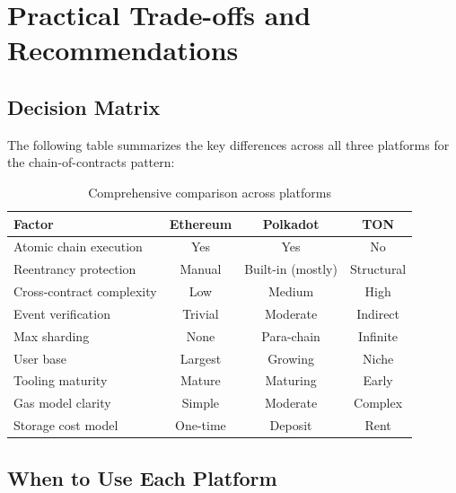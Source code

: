 \section{Practical Trade-offs and Recommendations}

\subsection{Decision Matrix}

The following table summarizes the key differences across all three platforms
for the chain-of-contracts pattern:

\begin{table}[h]
\centering
\small
\begin{tabular}{|l|c|c|c|}
\hline
\textbf{Factor} & \textbf{Ethereum} & \textbf{Polkadot} & \textbf{TON} \\
\hline
Atomic chain execution & Yes & Yes & No \\
Reentrancy protection & Manual & Built-in (mostly) & Structural \\
Cross-contract complexity & Low & Medium & High \\
Event verification & Trivial & Moderate & Indirect \\
Max sharding & None & Para-chain & Infinite \\
User base & Largest & Growing & Niche \\
Tooling maturity & Mature & Maturing & Early \\
Gas model clarity & Simple & Moderate & Complex \\
Storage cost model & One-time & Deposit & Rent \\
\hline
\end{tabular}
\caption{Comprehensive comparison across platforms}
\end{table}

\subsection{When to Use Each Platform}

